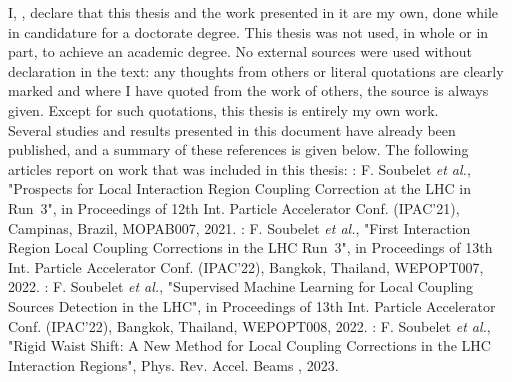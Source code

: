 \begin{declaration}
\addchaptertocentry{\authorshipname} %

\vspace{1cm}

I, \authorname, declare that this thesis and the work presented in it are my own, done while in candidature for a doctorate degree.
This thesis was not used, in whole or in part, to achieve an academic degree.
No external sources were used without declaration in the text: any thoughts from others or literal quotations are clearly marked and where I have quoted from the work of others, the source is always given.
Except for such quotations, this thesis is entirely my own work.\\

Several studies and results presented in this document have already been published, and a summary of these references is given below.
The following articles report on work that was included in this thesis:
\newline \newline
\noindent\cite{IPAC:Soubelet:Prospect_IR_Coupling_Correction_LHC_Run3}: F. Soubelet \textit{et al.}, "Prospects for Local Interaction Region Coupling Correction at the LHC in Run~\num{3}", in Proceedings of \num{12}th Int. Particle Accelerator Conf. (IPAC'21), Campinas, Brazil, MOPAB007, \num{2021}.
\newline \newline
\noindent\cite{IPAC:Soubelet:First_Corrections_IR_Local_Coupling_LHC_Run3}: F. Soubelet \textit{et al.}, "First Interaction Region Local Coupling Corrections in the LHC Run~\num{3}", in Proceedings of \num{13}th Int. Particle Accelerator Conf. (IPAC'22), Bangkok, Thailand, WEPOPT007, \num{2022}.
\newline \newline
\noindent\cite{IPAC:Soubelet:Supervised_Machine_Learning_Local_Coupling_Sources_Detection_LHC}: F. Soubelet \textit{et al.}, "Supervised Machine Learning for Local Coupling Sources Detection in the LHC", in Proceedings of \num{13}th Int. Particle Accelerator Conf. (IPAC'22), Bangkok, Thailand, WEPOPT008, \num{2022}.
\newline \newline
\noindent{}: F. Soubelet \textit{et al.}, "Rigid Waist Shift: A New Method for Local Coupling Corrections in the LHC Interaction Regions", Phys. Rev. Accel. Beams , \num{2023}.
\newline \newline

\end{declaration}
